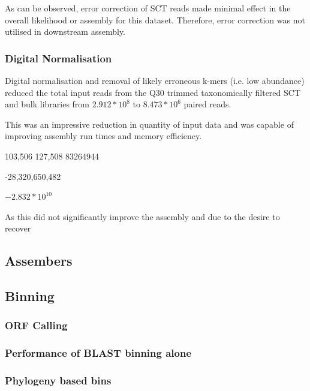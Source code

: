 As can be observed, error correction of SCT reads made minimal effect in the overall likelihood
or assembly for this dataset.  Therefore, error correction was not utilised
in downstream assembly.

\subsubsection{Digital Normalisation} 

Digital normalisation and removal of likely erroneous k-mers (i.e. low abundance) 
reduced the total input reads from the Q30 trimmed taxonomically
filtered SCT and bulk libraries from 
\(2.912*10^{8}\) to \(8.473*10^6\) paired reads.

This was an impressive reduction in quantity of input data and was capable of
improving assembly run times and memory efficiency.





103,506 
127,508
83264944

-28,320,650,482

\(-2.832*10^{10}\) 














As this did not significantly improve the assembly and due to the desire
to recover 


\subsection{Assembers}

\subsection{Binning}

\subsubsection{ORF Calling}

\subsubsection{Performance of BLAST binning alone}

\subsubsection{Phylogeny based bins}







